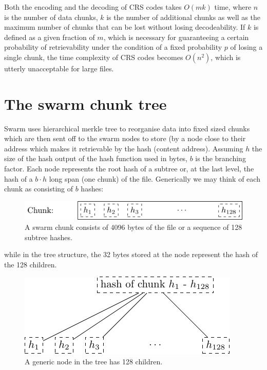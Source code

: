 \documentclass[12pt]{article}
\begin{document}
%
%

Both the encoding and the decoding of CRS codes takes $O(mk)$ time, where $n$ is the number of data chunks, $k$ is the number of additional chunks as well as the maximum number of chunks that can be lost without losing decodeability. If $k$ is defined as a given fraction of $m$, which is necessary for guaranteeing a certain probability of retrievability under the condition of a fixed probability $p$ of losing a single chunk, the time complexity of CRS codes becomes $O(n^2)$, which is utterly unacceptable for large files. %

\section{The swarm chunk tree}

Swarm uses hierarchical merkle tree \cite{merkle1980protocols} to reorganise data into fixed sized chunks which are then sent off to the swarm nodes to store (by a node close to their address which makes it retrievable by the hash (content address).
Assuming $h$ the size of the hash output of the hash function used in bytes, $b$ is the branching factor. Each node represents the root hash of a subtree or, at the last level, the hash of a $b\cdot h$ long span (one chunk) of the file. Generically we may think of each chunk as consisting of $b$ hashes:


\begin{figure}[htbp]
   \centering
   \includegraphics{fig/chunk.pdf} %
   \caption{A swarm chunk consists of 4096 bytes of the file or a sequence of 128 subtree hashes.}
   \label{fig:chunk}
\end{figure}

while in the tree structure, the 32 bytes stored at the node represent the hash of the 128 children.

\begin{figure}[htbp]
   \centering
   \includegraphics{fig/treebasic.pdf} %
   \caption{ A generic node in the tree has 128 children.}
   \label{fig:treebasic}
\end{figure}
\end{document}

